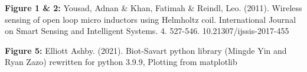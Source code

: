 \documentclass{article}
\begin{document}
   \begin{theindex}
       \item \textbf{Figure 1 \& 2:}
       \subitem Yousad, Adnan \& Khan, Fatimah \& Reindl, Leo. (2011). Wireless sensing of open loop micro inductors using Helmholtz coil. International Journal on Smart Sensing and Intelligent Systems. 4. 527-546. 10.21307/ijssis-2017-455
        \item \textbf{Figure 5:}
        \subitem Elliott Ashby. (2021). Biot-Savart python library (Mingde Yin and Ryan Zazo) rewritten for python 3.9.9, Plotting from matplotlib
    \end{theindex}
\end{document}
